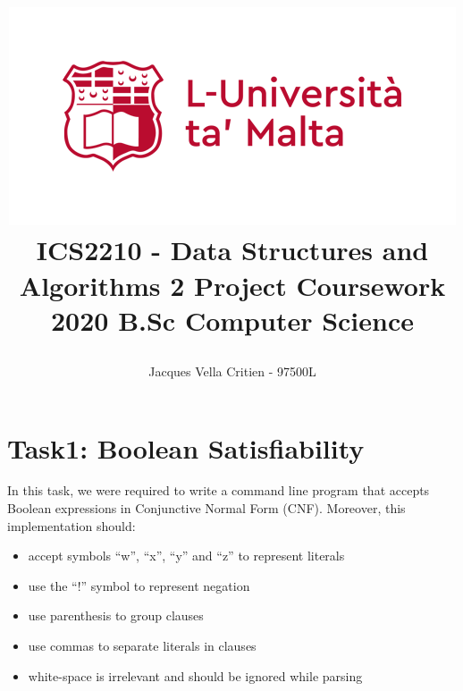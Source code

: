 \documentclass{article}
\newcommand{\quotes}[1]{``#1''}
\begin{document}
			\title{\includegraphics[scale = .6]{uom.png}
				\linebreak 
				\textbf{ICS2210 - Data Structures and Algorithms 2}\linebreak\linebreak
				\textbf{Project Coursework 2020}\linebreak\linebreak
				\large{B.Sc Computer Science}
				\date{}
				\author{Jacques Vella Critien - 97500L}}
				
				\begin{titlepage}
					\maketitle
					\thispagestyle{empty}
				\end{titlepage}
				
				\tableofcontents
				\newpage
				
				\section{Task1: Boolean Satisfiability}
				
				In this task, we were required to write a command line program that accepts Boolean expressions in Conjunctive Normal Form (CNF). Moreover, this implementation should:
				
				\begin{itemize}
				\item accept symbols \quotes{w}, \quotes{x}, \quotes{y} and \quotes{z} to represent literals
				\item use the \quotes{!} symbol to represent negation
				\item use parenthesis to group clauses
				\item use commas	to	separate literals	in	clauses
				\item white-space is irrelevant and should be ignored while parsing
				\end{itemize} 
				
\end{document}
